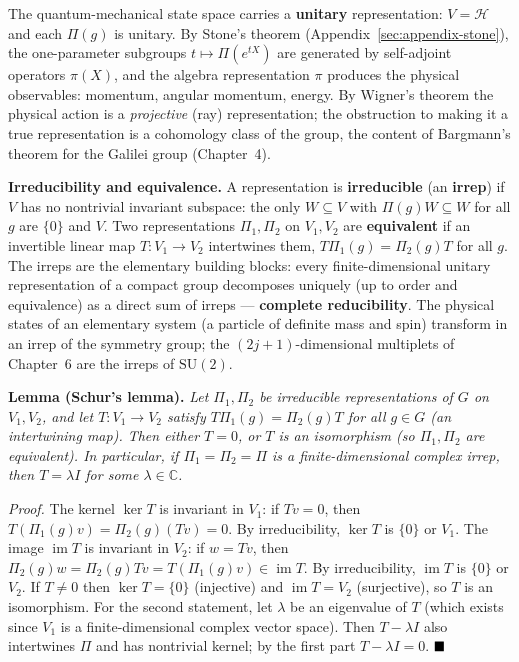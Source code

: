 The quantum-mechanical state space carries a \textbf{unitary} representation: $V=\mathcal H$ and each $\Pi(g)$ is unitary. By Stone's theorem (Appendix~\ref{sec:appendix-stone}), the one-parameter subgroups $t\mapsto\Pi(e^{tX})$ are generated by self-adjoint operators $\pi(X)$, and the algebra representation $\pi$ produces the physical observables: momentum, angular momentum, energy. By Wigner's theorem the physical action is a \emph{projective} (ray) representation; the obstruction to making it a true representation is a cohomology class of the group, the content of Bargmann's theorem for the Galilei group (Chapter~4).

\medskip\noindent\textbf{Irreducibility and equivalence.} A representation is \textbf{irreducible} (an \textbf{irrep}) if $V$ has no nontrivial invariant subspace: the only $W\subseteq V$ with $\Pi(g)W\subseteq W$ for all $g$ are $\{0\}$ and $V$. Two representations $\Pi_{1},\Pi_{2}$ on $V_{1},V_{2}$ are \textbf{equivalent} if an invertible linear map $T:V_{1}\to V_{2}$ intertwines them, $T\Pi_{1}(g)=\Pi_{2}(g)T$ for all $g$. The irreps are the elementary building blocks: every finite-dimensional unitary representation of a compact group decomposes uniquely (up to order and equivalence) as a direct sum of irreps --- \textbf{complete reducibility}. The physical states of an elementary system (a particle of definite mass and spin) transform in an irrep of the symmetry group; the $(2j+1)$-dimensional multiplets of Chapter~6 are the irreps of $\mathrm{SU}(2)$.

\medskip\noindent\textbf{Lemma (Schur's lemma).} \emph{Let $\Pi_{1},\Pi_{2}$ be irreducible representations of $G$ on $V_{1},V_{2}$, and let $T:V_{1}\to V_{2}$ satisfy $T\Pi_{1}(g)=\Pi_{2}(g)T$ for all $g\in G$ (an intertwining map). Then either $T=0$, or $T$ is an isomorphism (so $\Pi_{1},\Pi_{2}$ are equivalent). In particular, if $\Pi_{1}=\Pi_{2}=\Pi$ is a finite-dimensional complex irrep, then $T=\lambda I$ for some $\lambda\in\mathbb C$.}

\emph{Proof.} The kernel $\ker T$ is invariant in $V_{1}$: if $Tv=0$, then $T(\Pi_{1}(g)v)=\Pi_{2}(g)(Tv)=0$. By irreducibility, $\ker T$ is $\{0\}$ or $V_{1}$. The image $\operatorname{im}T$ is invariant in $V_{2}$: if $w=Tv$, then $\Pi_{2}(g)w=\Pi_{2}(g)Tv=T(\Pi_{1}(g)v)\in\operatorname{im}T$. By irreducibility, $\operatorname{im}T$ is $\{0\}$ or $V_{2}$. If $T\neq0$ then $\ker T=\{0\}$ (injective) and $\operatorname{im}T=V_{2}$ (surjective), so $T$ is an isomorphism. For the second statement, let $\lambda$ be an eigenvalue of $T$ (which exists since $V_{1}$ is a finite-dimensional complex vector space). Then $T-\lambda I$ also intertwines $\Pi$ and has nontrivial kernel; by the first part $T-\lambda I=0$. $\hfill\blacksquare$


